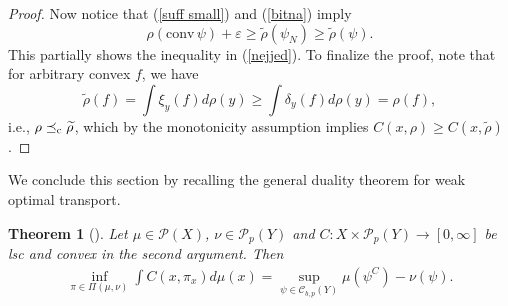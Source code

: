\documentclass[reqno, a4paper]{amsart}
\newcommand{\lc}{\preceq_{\textnormal{c}}}
\newtheorem{theorem}{Theorem}[section]
\newcommand{\conv}{\mathrm{conv}\,}
\newcommand{\PP}{\mathcal{P}}
\theoremstyle{definition}
\theoremstyle{definition}
\theoremstyle{definition}
\begin{document}
\begin{proof}
Now notice that (\ref{suff small}) and (\ref{bitna}) imply
\begin{equation} \label{bistna}
       \rho(\conv{\psi})+\varepsilon\geq \widetilde{\rho}(\psi_N)\geq\widetilde{\rho}(\psi).
   \end{equation}
This partially shows the inequality in (\ref{nejjed}). To finalize the proof, note that for arbitrary convex $f$, we have
$$\widetilde{\rho}(f)=\int \xi_y(f)d\rho(y)\geq\int \delta_y(f)d\rho(y)=\rho(f),$$
i.e., $\rho\lc\widetilde{\rho}$, which by the monotonicity assumption implies $C(x,\rho)\geq C(x,\widetilde{\rho})$.
\end{proof}

We conclude this section by recalling the general duality theorem for weak optimal transport.
\begin{theorem}[{\cite[{Theorem 1.3}]{veraguas2019existence}}]\label{th:kantorovichduality}
	 Let $\mu\in\PP(X)$, $\nu \in \PP_p(Y)$ and $C:X\times\PP_p(Y)\to[0,\infty]$ be lsc and convex in the second argument. Then
	\begin{align}
		\inf_{\pi\in\Pi(\mu,\nu)} \int C(x,\pi_x)d\mu(x) = \sup_{\psi \in {\mathcal{C}}_{b,p}(Y)} \mu(\psi^C) - \nu(\psi).
	\end{align}
\end{theorem}

\end{document}
